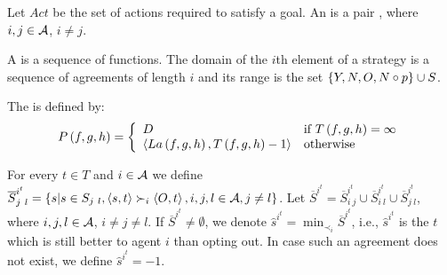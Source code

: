 \begin{defi}[Agreement]
Let $Act$ be the set of actions required to satisfy a goal. An  is a pair , where $i,j\in\mathcal{A}$, $i\neq j$.
\cite{conf/ijcai/KrausW91}
\end{defi}

\begin{defi}[Strategy]
A  is a sequence of functions. The domain of the $i$th element of a strategy is a sequence of agreements of length $i$ and its range is the set $\left\{ Y,N,O,N\circ p\right\}\cup S$.
\cite{conf/ijcai/KrausW91}
\end{defi}

\begin{defi}
The  is defined by:
\begin{equation}
P\left(f,g,h\right)=\left\{\begin{array}{ll}
D&\mbox{if }T\left(f,g,h\right)=\infty\\
\left\langle La\left(f,g,h\right),T\left(f,g,h\right)-1\right\rangle&\mbox{otherwise}
\end{array}\right.
\end{equation}
\cite{conf/ijcai/KrausW91}
\end{defi}

\begin{defi}
For every $t\in T$ and $i\in\mathcal{A}$ we define $\overline{S}^{i^t}_{j\ l}=\accol{s|s\in S_{j\ l},\tuple{s,t}\succ_i\tuple{O,t},i,j,l\in\calA,j\neq l}$. Let $\overline{S}^{i^t}=\overline{S}^{i^t}_{i\ j}\cup\overline{S}^{i^t}_{i\ l}\cup\overline{S}^{i^t}_{j\ l}$, where $i,j,l\in\mathcal{A}$, $i\neq j\neq l$. If $\overline{S}^{i^t}\neq\emptyset$, we denote $\hat{s}^{i^t}=\displaystyle\min_{\prec_i}\overline{S}^{i^t}$, i.e., $\hat{s}^{i^t}$ is the  $t$ which is still better to agent $i$ than opting out. In case such an agreement does not exist, we define $\hat{s}^{i^t}=-1$.
\cite{conf/ijcai/KrausW91}
\end{defi}